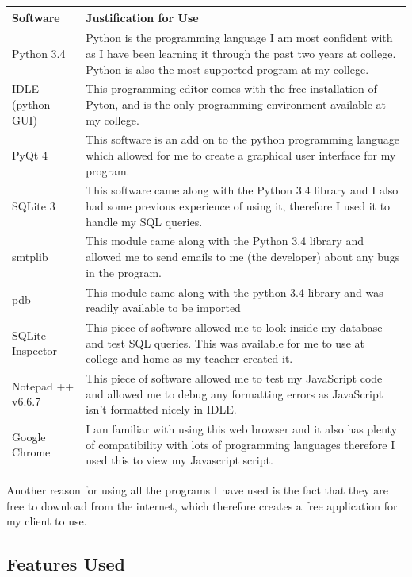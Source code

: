 \begin{center}
\begin{tabular}{|p{3.5cm}|p{8cm}|} \hline
\textbf{Software} & \textbf{Justification for Use} \\ \hline
Python 3.4 & Python is the programming language I am most confident with as I have been learning it through the past two years at college. Python is also the most supported program at my college. \\ \hline
IDLE (python GUI) & This programming editor comes with the free installation of Pyton, and is the only programming environment available at my college. \\ \hline
PyQt 4 & This software is an add on to the python programming language which allowed for me to create a graphical user interface for my program. \\ \hline
SQLite 3 & This software came along with the Python 3.4 library and I also had some previous experience of using it, therefore I used it to handle my SQL queries. \\ \hline
smtplib & This module came along with the Python 3.4 library and allowed me to send emails to me (the developer) about any bugs in the program. \\ \hline
pdb & This module came along with the python 3.4 library and was readily available to be imported \\ \hline
SQLite Inspector & This piece of software allowed me to look inside my database and test SQL queries. This was available for me to use at college and home as my teacher created it. \\ \hline
Notepad ++ v6.6.7 & This piece of software allowed me to test my JavaScript code and allowed me to debug any formatting errors as JavaScript isn't formatted nicely in IDLE. \\ \hline
Google Chrome & I am familiar with using this web browser and it also has plenty of compatibility with lots of programming languages therefore I used this to view my Javascript script. \\ \hline

\end{tabular}
\label{tab:Software Justification}
\end{center}


Another reason for using all the programs I have used is the fact that they are free to download from the internet, which therefore creates a free application for my client to use.

\subsection{Features Used}

